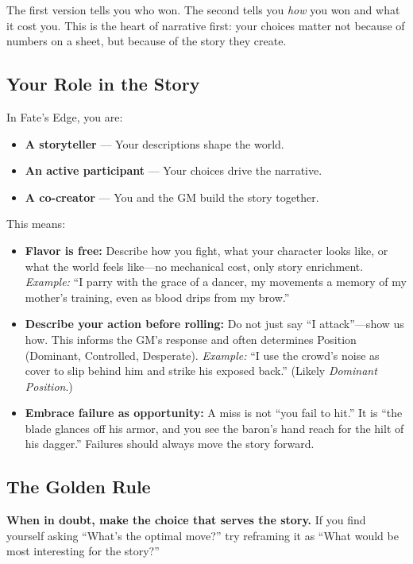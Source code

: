 The first version tells you who won. The second tells you \textit{how} you won and what it cost you. This is the heart of narrative first: your choices matter not because of numbers on a sheet, but because of the story they create.

\subsection{Your Role in the Story}

In Fate's Edge, you are:
\begin{itemize}
\item \textbf{A storyteller} --- Your descriptions shape the world.
\item \textbf{An active participant} --- Your choices drive the narrative.
\item \textbf{A co-creator} --- You and the GM build the story together.
\end{itemize}

This means:
\begin{itemize}
\item \textbf{Flavor is free:} Describe how you fight, what your character looks like, or what the world feels like---no mechanical cost, only story enrichment.  
\emph{Example:} ``I parry with the grace of a dancer, my movements a memory of my mother's training, even as blood drips from my brow.''

\item \textbf{Describe your action before rolling:} Do not just say ``I attack''---show us how. This informs the GM's response and often determines Position (Dominant, Controlled, Desperate).  
\emph{Example:} ``I use the crowd's noise as cover to slip behind him and strike his exposed back.'' (Likely \textit{Dominant Position}.)

\item \textbf{Embrace failure as opportunity:} A miss is not ``you fail to hit.'' It is ``the blade glances off his armor, and you see the baron's hand reach for the hilt of his dagger.'' Failures should always move the story forward.
\end{itemize}

\subsection{The Golden Rule}

\textbf{When in doubt, make the choice that serves the story.} If you find yourself asking ``What's the optimal move?'' try reframing it as ``What would be most interesting for the story?''


